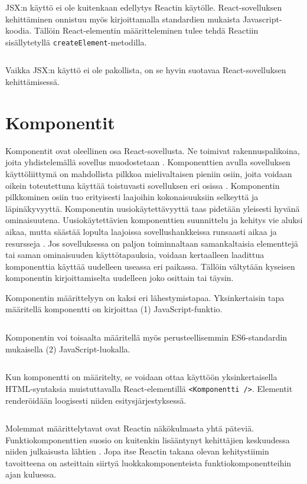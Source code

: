 JSX:n käyttö ei ole kuitenkaan edellytys Reactin käytölle. React-sovelluksen kehittäminen onnistuu myös kirjoittamalla standardien mukaista Javascript-koodia. Tällöin React-elementin määritteleminen tulee tehdä Reactiin sisällytetyllä \texttt{createElement}-metodilla. \cite{reactdocswithoutjsx}
\inputminted[bgcolor=black]{jsx.py:JsxLexer -x}{listaukset/withoutjsx.js}
Vaikka JSX:n käyttö ei ole pakollista, on se hyvin suotavaa React-sovelluksen kehittämisessä.


\section{Komponentit}
\label{Komponentit}

Komponentit ovat oleellinen osa React-sovellusta. Ne toimivat rakennuspalikoina, joita yhdistelemällä sovellus muodostetaan \cite{reactdocscomponents}. Komponenttien avulla sovelluksen käyttöliittymä on mahdollista pilkkoa mielivaltaisen pieniin osiin, joita voidaan oikein toteutettuna käyttää toistuvasti sovelluksen eri osissa \cite{reactdocscomponents}. Komponentin pilkkominen osiin tuo erityisesti laajoihin kokonaisuuksiin selkeyttä ja läpinäkyvyyttä. Komponentin uusiokäytettävyyttä taas pidetään yleisesti hyvänä ominaisuutena. Uusiokäytettävien komponenttien suunnittelu ja kehitys vie aluksi aikaa, mutta säästää lopulta laajoissa sovellushankkeissa runsaasti aikaa ja resursseja \cite{holzmann}. Jos sovelluksessa on paljon toiminnaltaan samankaltaisia elementtejä tai saman ominaisuuden käyttötapauksia, voidaan kertaalleen laadittua komponenttia käyttää uudelleen useassa eri paikassa. Tällöin vältytään kyseisen komponentin kirjoittamiselta uudelleen joko osittain tai täysin.

Komponentin määrittelyyn on kaksi eri lähestymistapaa. Yksinkertaisin tapa määritellä komponentti on kirjoittaa (1) JavaScript-funktio. \cite{reactdocscomponents}
\inputminted[bgcolor=black]{jsx.py:JsxLexer -x}{listaukset/functioncomponent.js}
Komponentin voi toisaalta määritellä myös perusteellisemmin ES6-standardin mukaisella (2) JavaScript-luokalla. \cite{reactdocscomponents}
\inputminted[bgcolor=black]{jsx.py:JsxLexer -x}{listaukset/classcomponent.js}
Kun komponentti on määritelty, se voidaan ottaa käyttöön yksinkertaisella HTML-syntaksia muistuttavalla React-elementillä \texttt{<Komponentti />}. Elementit renderöidään loogisesti niiden esitysjärjestyksessä. 
\inputminted[bgcolor=black,highlightlines={4-5},highlightcolor=darkgray]{jsx.py:JsxLexer -x}{listaukset/componentusage.js}
Molemmat määrittelytavat ovat Reactin näkökulmasta yhtä päteviä. Funktiokomponenttien suosio on kuitenkin lisääntynyt kehittäjien keskuudessa niiden julkaisusta lähtien \cite{twilio}. Jopa itse Reactin takana olevan kehitystiimin tavoitteena on asteittain siirtyä luokkakomponenteista funktiokomponentteihin ajan kuluessa. \cite{reactdocshooks}


